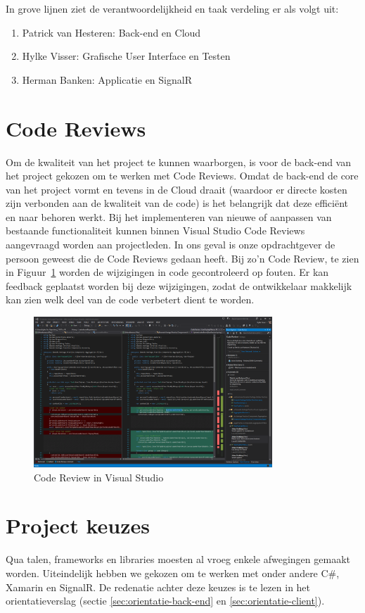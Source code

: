 In grove lijnen ziet de verantwoordelijkheid en taak verdeling er als volgt uit:
\begin{enumerate}
\item Patrick van Hesteren: Back-end en Cloud
\item Hylke Visser: Grafische User Interface en Testen
\item Herman Banken: Applicatie en SignalR
\end{enumerate}

\section{Code Reviews}
Om de kwaliteit van het project te kunnen waarborgen, is voor de back-end van het project gekozen om te werken met Code Reviews. Omdat de back-end de core van het project vormt en tevens in de Cloud draait (waardoor er directe kosten zijn verbonden aan de kwaliteit van de code) is het belangrijk dat deze efficiënt en naar behoren werkt. Bij het implementeren van nieuwe of aanpassen van bestaande functionaliteit kunnen binnen Visual Studio Code Reviews aangevraagd worden aan projectleden. In ons geval is onze opdrachtgever de persoon geweest die de Code Reviews gedaan heeft. Bij zo'n Code Review, te zien in Figuur~\ref{fig:code-review} worden de wijzigingen in code gecontroleerd op fouten. Er kan feedback geplaatst worden bij deze wijzigingen, zodat de ontwikkelaar makkelijk kan zien welk deel van de code verbetert dient te worden.

\begin{figure}
  \begin{center}
    \includegraphics[width=0.8\textwidth]{style/images/screenshots/CodeReview}
  \end{center}
  \caption{Code Review in Visual Studio}
  \label{fig:code-review}
\end{figure}

\section{Project keuzes}
Qua talen, frameworks en libraries moesten al vroeg enkele afwegingen gemaakt worden. Uiteindelijk hebben we gekozen om te werken met onder andere C\#, Xamarin en SignalR. De redenatie achter deze keuzes is te lezen in het orientatieverslag (sectie \ref{sec:orientatie-back-end}
en \ref{sec:orientatie-client}).

